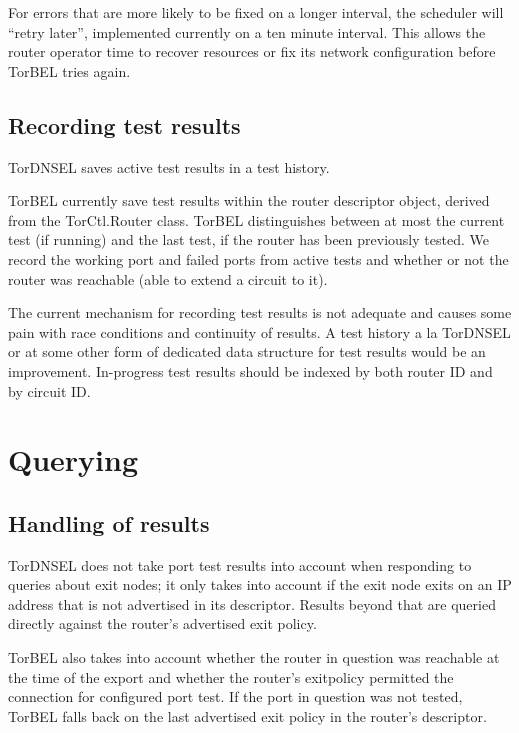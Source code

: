 \documentclass{article}
\begin{document}
For errors that are more likely to be fixed on a longer interval, the
scheduler will ``retry later'', implemented currently on a ten minute
interval.  This allows the router operator time to recover resources
or fix its network configuration before TorBEL tries again.

\subsection{Recording test results}

TorDNSEL saves active test results in a test history.

TorBEL currently save test results within the router descriptor
object, derived from the TorCtl.Router class.  TorBEL distinguishes
between at most the current test (if running) and the last test,
if the router has been previously tested.  We record the working
port and failed ports from active tests and whether or not the
router was reachable (able to extend a circuit to it).

The current mechanism for recording test results is not adequate and
causes some pain with race conditions and continuity of results.  A
test history a la TorDNSEL or at some other form of dedicated data
structure for test results would be an improvement.  In-progress test
results should be indexed by both router ID and by circuit ID.

\section{Querying}

\subsection{Handling of results}
TorDNSEL does not take port test results into account when responding to
queries about exit nodes; it only takes into account if the exit node exits
on an IP address that is not advertised in its descriptor.  Results beyond
that are queried directly against the router's advertised exit policy.

TorBEL also takes into account whether the router in question was
reachable at the time of the export and whether the router's
exitpolicy permitted the connection for configured port test.  If the
port in question was not tested, TorBEL falls back on the last
advertised exit policy in the router's descriptor.
\end{document}
